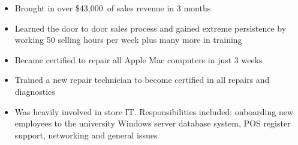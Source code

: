 

	\begin{fullwidth}
		\makecvheader
	\end{fullwidth}



	\begin{itemize}
		\item Brought in over \$43,000\ of sales revenue in 3 months
			\smallskip
		\item Learned the door to door sales process and gained extreme persistence by working
			50 selling hours per week plus many more in training
	\end{itemize}

	\divider

	\begin{itemize}
		\item Became certified to repair all Apple Mac computers in just 3 weeks
			\smallskip
		\item Trained a new repair technician to become certified in all repairs
			and diagnostics
			\smallskip
		\item Was heavily involved in store IT. Responsibilities included: onboarding new employees to the university Windows server database system, POS register support, networking and general issues
	\end{itemize}
	
